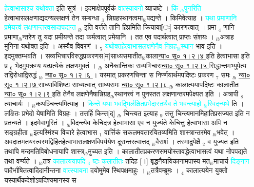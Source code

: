 \documentclass[article,12pt,a4paper]{memoir}%
\newcommand{\quotelemma}[1]{\textcolor{cyan}{#1}}
\begin{document}
	  
	  \pstart \leavevmode%
	\hphantom{.}\quotelemma{हेत्वाभासाश्च यथोक्ता} इति सूत्रं । इदमाक्षेपपूर्वकं \quotelemma{वात्स्यायनो} व्याचष्टे । \quotelemma{किं {\tiny $_{lb}$}पुनरिति} \cite[20a6]{vn-msN} हेत्वाभासलक्षणाद्यदन्यल्लक्षणं तेन सम्बन्धा {\tiny $_{3}$} न्निग्रहस्थानत्वमा{\tiny $_{lb}$}पद्यन्ते । किमिवेत्याह । \quotelemma{यथा प्रमाणानि प्रमेयत्त्वं लक्षणान्तरवसा\edtext{}{\lemma{सा}\Bfootnote{? वसा}}दापद्यन्त} {\tiny $_{lb}$} \cite[20a6]{vn-msN} इति वर्त्तते तानि हिप्रमिति क्रियाया[ः] कारणत्वात् । प्रमा {\tiny $_{4}$} णानि प्रमाणा{\tiny $_{lb}$}न्तरेण तु यदा प्रमीयन्ते तदा कर्मत्वात् प्रमेयानि । तत एव पदार्थत्वात् प्राप्तः संशयः । {\tiny $_{lb}$}अत्राह मुनिना यथोक्त इति । अस्यैव विवरणं । {\tiny $_{5}$} \quotelemma{यथोक्तहेत्वाभासलक्षणेनैव निग्रह{\tiny $_{lb}$}स्थान} भाव इति । इदमुक्तम्भवति । सव्यभिचारविरुद्धप्रकरणस[म]साध्यसमातीत{\tiny $_{lb}$}काला\href{http://sarit.indology.info/?cref=ns\%C5\%AB.1.2.4}{न्या० सू० १।२।४ } इति हेत्वाभासा इति प्र {\tiny $_{6}$} भेदमुपक्रम्य यत्प्रत्येकं लक्षणमुक्तं । {\tiny $_{lb}$} अनैकान्तिकः सव्यभिचारः\href{http://sarit.indology.info/?cref=ns\%C5\%AB.1.2.5}{न्या० सू० १।२।५ } सिद्धान्तमभ्युपेत्य तद्विरोधाद्विरुद्धं {\tiny $_{lb}$} \href{http://sarit.indology.info/?cref=ns\%C5\%AB.1.2.6}{न्या० सू० १।२।६ } । यस्मात् प्रकरणचिन्ता स निर्ण्णयार्थमपदिष्टः प्रकरण {\tiny $_{7}$} समः {\tiny $_{lb}$} \href{http://sarit.indology.info/?cref=ns\%C5\%AB.1.2.7}{न्या० सू० १।२।७ } साध्याविशिष्टः साध्यत्वात् साध्यसमः \href{http://sarit.indology.info/?cref=ns\%C5\%AB.1.2.8}{न्या० सू० १।२।८ } {\tiny $_{lb}$} कालात्ययापदिष्टः कालातीत \href{http://sarit.indology.info/?cref=ns\%C5\%AB.1.2.9}{न्या० सू० १।२।९ } इति तेनैव लक्षणेनैषान्निग्रह{\tiny $_{lb}$}स्थानत्त्वं न पुनस्तत लक्षणान्तरमपेक्ष्यत इति । अत्रापी {\tiny $_{8}$} \cite[20a7]{vn-msN} त्याचार्यः । {\tiny $_{lb}$}कथञ्चिन्त्यमित्याह । \quotelemma{किन्ते यथा भवद्भिर्लक्षितप्रभेदास्तथैव ते भवन्त्याहो {\tiny $_{lb}$}स्विदन्यथे} ति \cite[20a7]{vn-msN} । लक्षितः प्रभेदो येषामिति विग्रहः । तत्तर्हि किन्त[द्] {\tiny $_{lb}$} चिन्त्यत इत्याह {\tiny $_{9}$} \leavevmode{} तत्तु चिन्त्यमानमिहातिप्रसज्यत इति न प्रतन्यते । इदमेवागूरितं । {\tiny $_{lb}$}विदन्त्येव केचिदत्र हेत्वाभासा एव न युज्यंते केचित्तु हेत्वाभासा अपि न सङ्ग्रहीता {\tiny $_{lb}$}इत्यस्मिंश्च विचारे हेत्वाभास {\tiny $_{1}$} वार्त्तिकं सकलमवतारयितव्यमिति शास्त्रान्तरमेव {\tiny $_{lb}$}भवेत् । अवदातमतयस्त्वस्मद्विहितहेत्वाभासलक्षणविपर्ययेण दूरान्तरत्वात्तद् {\tiny $_{lb}$}वैसशं । तस्मादुपेक्षै {\tiny $_{2}$} व युज्यत इति । तथापि मन्दमतिविबोधनायापि शास्त्र{\tiny $_{lb}$}मुच्यत इति । कालातीतप्रकरणसमयोस्तावद्धेत्वाभासत्वं यथा नोपपद्यते तथा वर्ण्यते । {\tiny $_{lb}$}तत्र \quotelemma{कालात्ययापदि {\tiny $_{3}$} ष्टः कलातीतः} तदिह [।] बृद्धनैयायिकानामपास्य मत{\tiny $_{lb}$}माचार्य \quotelemma{दिङ्नाग} पादैर्भाषितत्वादिदानीन्तना \quotelemma{वात्स्यायना} दयोमुमेव स्थिपक्षमाहुः । {\tiny $_{lb}$}तत्रैवम्ब्रूमः । {\tiny $_{4}$} कालात्ययेन युक्तो यस्यार्थैकदेशोऽपदिश्यमानस्य स 
\end{document}
